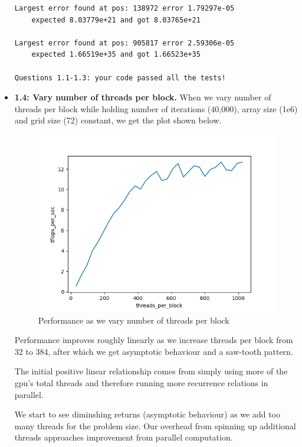 \documentclass[12pt,letterpaper,twoside]{article}
\begin{document}
\begin{itemize}
\begin{verbatim}
Largest error found at pos: 138972 error 1.79297e-05 
    expected 8.03779e+21 and got 8.03765e+21

Largest error found at pos: 905817 error 2.59306e-05 
    expected 1.66519e+35 and got 1.66523e+35

Questions 1.1-1.3: your code passed all the tests!
\end{verbatim}

    \item \textbf{1.4: Vary number of threads per block.} When we 
    vary number of threads per block while holding number of 
    iterations (40,000), array size (1e6) and grid size (72) 
    constant, we get the plot shown below. 
    
    \begin{figure}[h]
        \center
        \includegraphics[scale=0.7]{q1_4.png}
        \caption{Performance as we vary number of threads per block}
    \end{figure}

    Performance improves roughly linearly as we increase threads
    per block from 32 to 384, after which we get asymptotic 
    behaviour and a saw-tooth pattern. 

    The initial positive linear relationship comes from simply 
    using more of the gpu's total threads and therefore running 
    more recurrence relations in parallel.

    We start to see diminshing returns (asymptotic behaviour) as
    we add too many threads for the problem size. Our overhead from
    spinning up additional threads approaches improvement from 
    parallel computation.


\end{itemize}
\end{document}
